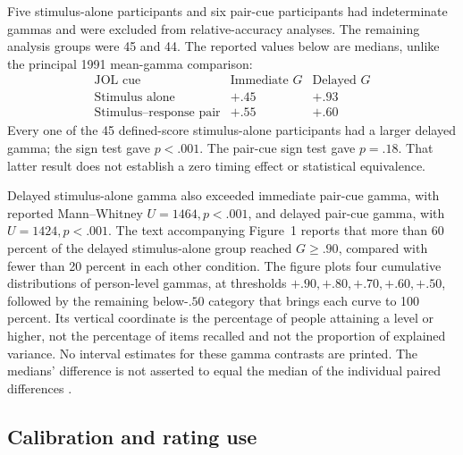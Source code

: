 Five stimulus-alone participants and six pair-cue participants
had indeterminate gammas and were excluded from relative-accuracy
analyses. The remaining analysis groups were 45 and 44.
The reported values below are medians, unlike the principal
1991 mean-gamma comparison:
\[
\begin{array}{l|cc}
 \text{JOL cue}&\text{Immediate }G&\text{Delayed }G\\\hline
 \text{Stimulus alone}&+.45&+.93\\
 \text{Stimulus--response pair}&+.55&+.60
\end{array}
\]
Every one of the 45 defined-score stimulus-alone participants had
a larger delayed gamma; the sign test gave \(p<.001\).
The pair-cue sign test gave \(p=.18\).
That latter result does not establish a zero timing effect or
statistical equivalence.

Delayed stimulus-alone gamma also exceeded immediate pair-cue
gamma, with reported Mann--Whitney \(U=1464,p<.001\), and delayed
pair-cue gamma, with \(U=1424,p<.001\).
The text accompanying Figure~1 reports that more than 60 percent of the delayed
stimulus-alone group reached \(G\geq.90\), compared with fewer
than 20 percent in each other condition.
The figure plots four cumulative distributions of person-level
gammas, at thresholds \(+.90,+.80,+.70,+.60,+.50\), followed
by the remaining below-\(.50\) category that brings each curve
to 100 percent. Its vertical coordinate is the percentage of
people attaining a level or higher, not the percentage of items
recalled and not the proportion of explained variance.
No interval estimates for these gamma contrasts are printed.
The medians' difference is not asserted to equal the median
of the individual paired differences
\cite[p.~376]{DunloskyNelson1992CueJOL}.

\subsection{Calibration and rating use}

